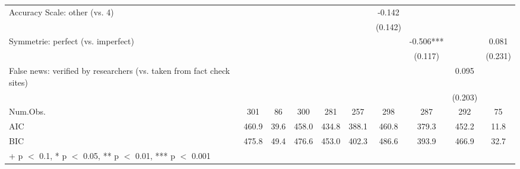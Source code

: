 \documentclass[
  doc,floatsintext]{apa6}
\begin{document}
\begin{table}
{\begin{tabular}[t]{lccccccccc}
Accuracy Scale: other (vs. 4) &  &  &  &  &  & -0.142 &  &  & \\
 &  &  &  &  &  & (0.142) &  &  & \\
Symmetrie: perfect (vs. imperfect) &  &  &  &  &  &  & -0.506*** &  & 0.081\\
 &  &  &  &  &  &  & (0.117) &  & (0.231)\\
False news: verified by researchers (vs. taken from fact check sites) &  &  &  &  &  &  &  & 0.095 & \\
 &  &  &  &  &  &  &  & (0.203) & \\
\midrule
Num.Obs. & 301 & 86 & 300 & 281 & 257 & 298 & 287 & 292 & 75\\
AIC & 460.9 & 39.6 & 458.0 & 434.8 & 388.1 & 460.8 & 379.3 & 452.2 & 11.8\\
BIC & 475.8 & 49.4 & 476.6 & 453.0 & 402.3 & 486.6 & 393.9 & 466.9 & 32.7\\
\bottomrule
\multicolumn{10}{l}{\rule{0pt}{1em}+ p $<$ 0.1, * p $<$ 0.05, ** p $<$ 0.01, *** p $<$ 0.001}\\
\end{tabular}}
\end{table}
\end{document}
